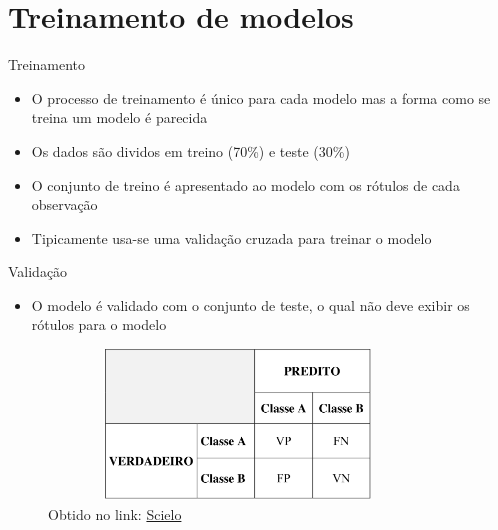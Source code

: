 \section{Treinamento de modelos}

\begin{frame}	
	\begin{block}{Treinamento}	
		\begin{itemize}
			\item O processo de treinamento é único para cada modelo mas a forma como se treina um modelo é parecida
			\item Os dados são dividos em treino (70\%) e teste (30\%)
			\item O conjunto de treino é apresentado ao modelo com os rótulos de cada observação
			\item Tipicamente usa-se uma validação cruzada para treinar o modelo
		\end{itemize}		
	\end{block}
\end{frame}

\begin{frame}	
	\begin{block}{Validação}	
		\begin{itemize}
			\item O modelo é validado com o conjunto de teste, o qual não deve exibir os rótulos para o modelo
		\end{itemize}
				\begin{figure}[!htb]
			\centering	  				
			\includegraphics[height=4cm, width = 10cm]{./pic/matrizConfusao.png}
			\caption{Obtido no link: \href{http://www.scielo.br/pdf/eagri/v33n6/19.pdf}{Scielo} }
			\label{fig_matriz_confusao}
		\end{figure}	
	\end{block}
\end{frame}

